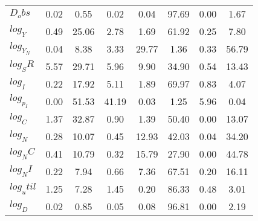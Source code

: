 \begin{center}
\begin{longtable}{lccccccc}
$D_obs     $	 & 	        0.02	 & 	        0.55	 & 	        0.02	 & 	        0.04	 & 	       97.69	 & 	        0.00	 & 	        1.67 \\ 
$log_Y     $	 & 	        0.49	 & 	       25.06	 & 	        2.78	 & 	        1.69	 & 	       61.92	 & 	        0.25	 & 	        7.80 \\ 
$log_Y_N   $	 & 	        0.04	 & 	        8.38	 & 	        3.33	 & 	       29.77	 & 	        1.36	 & 	        0.33	 & 	       56.79 \\ 
$log_SR    $	 & 	        5.57	 & 	       29.71	 & 	        5.96	 & 	        9.90	 & 	       34.90	 & 	        0.54	 & 	       13.43 \\ 
$log_I     $	 & 	        0.22	 & 	       17.92	 & 	        5.11	 & 	        1.89	 & 	       69.97	 & 	        0.83	 & 	        4.07 \\ 
$log_p_I   $	 & 	        0.00	 & 	       51.53	 & 	       41.19	 & 	        0.03	 & 	        1.25	 & 	        5.96	 & 	        0.04 \\ 
$log_C     $	 & 	        1.37	 & 	       32.87	 & 	        0.90	 & 	        1.39	 & 	       50.40	 & 	        0.00	 & 	       13.07 \\ 
$log_N     $	 & 	        0.28	 & 	       10.07	 & 	        0.45	 & 	       12.93	 & 	       42.03	 & 	        0.04	 & 	       34.20 \\ 
$log_NC    $	 & 	        0.41	 & 	       10.79	 & 	        0.32	 & 	       15.79	 & 	       27.90	 & 	        0.00	 & 	       44.78 \\ 
$log_NI    $	 & 	        0.22	 & 	        7.94	 & 	        0.66	 & 	        7.36	 & 	       67.51	 & 	        0.20	 & 	       16.11 \\ 
$log_util  $	 & 	        1.25	 & 	        7.28	 & 	        1.45	 & 	        0.20	 & 	       86.33	 & 	        0.48	 & 	        3.01 \\ 
$log_D     $	 & 	        0.02	 & 	        0.85	 & 	        0.05	 & 	        0.08	 & 	       96.81	 & 	        0.00	 & 	        2.19 \\ 
\end{longtable}
 \end{center}
